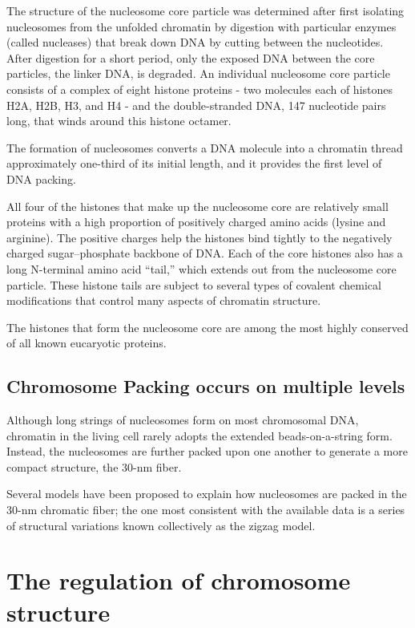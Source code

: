 The structure of the nucleosome core particle was determined after first
isolating nucleosomes from the unfolded chromatin by digestion with
particular enzymes (called nucleases) that break down DNA by cutting
between the nucleotides. After digestion for a short period, only the
exposed DNA between the core particles, the linker DNA, is degraded.
An individual nucleosome core particle consists of a complex of eight
histone proteins - two molecules each of histones H2A, H2B, H3, and
H4 - and the double-stranded DNA, 147 nucleotide pairs long, that winds
around this histone octamer.

The formation of nucleosomes converts a DNA molecule
into a chromatin thread approximately one-third of its initial length, and
it provides the first level of DNA packing.

All four of the histones that make up the nucleosome core are relatively
small proteins with a high proportion of positively charged amino acids
(lysine and arginine). The positive charges help the histones bind tightly
to the negatively charged sugar–phosphate backbone of DNA.
Each of the core histones also has a long
N-terminal amino acid “tail,” which extends out from the nucleosome
core particle. These histone tails are subject to several
types of covalent chemical modifications that control many aspects of
chromatin structure.

The histones that form the nucleosome core are among the most highly
conserved of all known eucaryotic proteins.

\subsection{Chromosome Packing occurs on multiple levels}

Although long strings of nucleosomes form on most chromosomal DNA,
chromatin in the living cell rarely adopts the extended beads-on-a-string
form. Instead, the nucleosomes are further packed
upon one another to generate a more compact structure, the 30-nm
fiber.

Several models have been proposed to explain how nucleosomes are packed in the 30-nm
chromatic fiber; the one most consistent with the available data is a series of structural
variations known collectively as the zigzag model.

\section{The regulation of chromosome structure}

